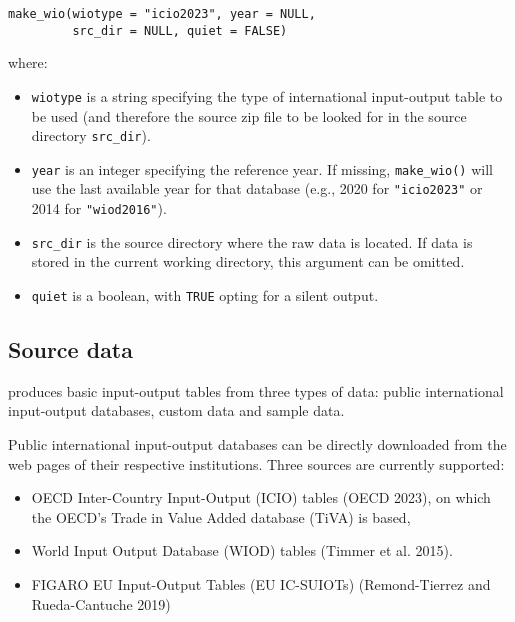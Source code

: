 \begin{verbatim}
make_wio(wiotype = "icio2023", year = NULL, 
         src_dir = NULL, quiet = FALSE)
\end{verbatim}

where:

\begin{itemize}
\tightlist
\item
  \texttt{wiotype} is a string specifying the type of international input-output table
  to be used (and therefore the source zip file to be looked for in the source
  directory \texttt{src\_dir}).
\item
  \texttt{year} is an integer specifying the reference year. If missing, \texttt{make\_wio()}
  will use the last available year for that database (e.g., 2020 for
  \texttt{"icio2023"} or 2014 for \texttt{"wiod2016"}).
\item
  \texttt{src\_dir} is the source directory where the raw data is located. If data is
  stored in the current working directory, this argument can be omitted.
\item
  \texttt{quiet} is a boolean, with \texttt{TRUE} opting for a silent output.
\end{itemize}

\hypertarget{source-data}{%
\subsection{Source data}\label{source-data}}

 produces basic input-output tables from three types
of data: public international input-output databases, custom data and
sample data.

Public international input-output databases can be directly downloaded from the
web pages of their respective institutions. Three sources are currently
supported:

\begin{itemize}
\tightlist
\item
  OECD Inter-Country Input-Output (ICIO) tables (OECD 2023), on which
  the OECD's Trade in Value Added database (TiVA) is based,
\item
  World Input Output Database (WIOD) tables (Timmer et al. 2015).
\item
  FIGARO EU Input-Output Tables (EU IC-SUIOTs) (Remond-Tierrez and Rueda-Cantuche 2019)
\end{itemize}

